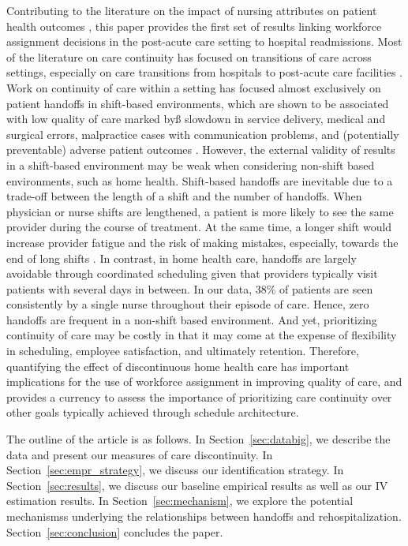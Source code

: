\documentclass[final,12pt, notitlepage]{article}
\begin{document}
Contributing to the literature on the impact of nursing attributes on patient health outcomes \citep{Aiken2002, Bae2010, Needleman2011, Cook2012, Lin2014, Lu2016, Hockenberry2016}, this paper provides the first set of results linking workforce assignment decisions in the post-acute care setting to hospital readmissions.
Most of the literature on care continuity has focused on transitions of care across settings, especially on care transitions from hospitals to post-acute care facilities \citep{Naylor1999}.
Work on continuity of care within a setting has focused almost exclusively on patient handoffs in shift-based environments, which are shown to be associated with low quality of care marked byß slowdown in service delivery, medical and surgical errors, malpractice cases with communication problems, and (potentially preventable) adverse patient outcomes \citep{Laine1993, Petersen1994, Riesenberg2009}.
However, the external validity of results in a shift-based environment may be weak when considering non-shift based environments, such as home health.  Shift-based handoffs are inevitable due to a trade-off between the length of a shift and the number of handoffs. When physician or nurse shifts are lengthened, a patient is more likely to see the same provider during the course of treatment. At the same time, a longer shift would increase provider fatigue and the risk of making mistakes, especially, towards the end of long shifts \citep{Brachet2012}. In contrast, in home health care, handoffs are largely avoidable through coordinated scheduling given that providers typically visit patients with several days in between. In our data, 38\% of patients are seen consistently by a single nurse throughout their episode of care. Hence, zero handoffs are frequent in a non-shift based environment.  And yet, prioritizing continuity of care may be costly in that it may come at the expense of flexibility in scheduling, employee satisfaction, and ultimately retention. 
Therefore, quantifying the effect of discontinuous home health care has important implications for the use of workforce assignment in improving quality of care, and provides a currency to assess the importance of prioritizing care continuity over other goals typically achieved through schedule architecture.




The outline of the article is as follows. In Section~\ref{sec:databig}, we describe the data and present our measures of care discontinuity. In Section~\ref{sec:empr_strategy}, we discuss our identification strategy. In Section~\ref{sec:results}, we discuss our baseline empirical results as well as our IV estimation results. In Section~\ref{sec:mechanism}, we explore the potential mechanismss underlying the relationships between handoffs and rehospitalization. Section~\ref{sec:conclusion} concludes the paper.
\end{document}

